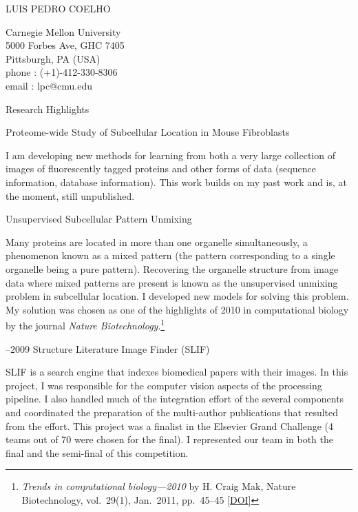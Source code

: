 \documentclass{article}
\renewcommand\section[1]{%
    \par\vspace{2em}\penalty-100%
    {\subhead #1}%
    \par\penalty100\vspace{1em}\penalty100%
}
\newcommand\cvitem[2][\relax]{%
    \par\vspace{.8em}
    \if\relax#1\else{\Date \textcolor{medg}{#1}}\hspace{1em}\fi%
    {\CvItem #2}%
    \par\vspace{.4em}
}
\newcommand\showdoi[1]{%
    \href{http://dx.doi.org/#1}{[DOI]}%
}
\begin{document}
\parindent=0cm

\begin{minipage}[t]{0.60\linewidth}%
\head \textcolor{darkg}{LUIS PEDRO COELHO}

\end{minipage}
\hfill
\begin{minipage}[t]{0.26\textwidth}%
\vspace{-2.2em}
{\Contact%
\textcolor{medg}{
Carnegie Mellon University\\
5000 Forbes Ave, GHC 7405\\
Pittsburgh, PA (USA)}\\
\textcolor{darkg}{phone} : (+1)-412-330-8306\\
\textcolor{darkg}{email} : lpc@cmu.edu
}
\end{minipage}

\vspace{2.3em}

\section{Research Highlights}
\Text

\cvitem[2011]{Proteome-wide Study of Subcellular Location in Mouse Fibroblasts}
I am developing new methods for learning from both a very large collection of
images of fluorescently tagged proteins and other forms of data (sequence
information, database information). This work builds on my past work and is, at
the moment, still unpublished.

\cvitem[2010]{Unsupervised Subcellular Pattern Unmixing}
Many proteins are located in more than one organelle simultaneously, a
phenomenon known as a mixed pattern (the pattern corresponding to a single
organelle being a pure pattern). Recovering the organelle structure from image
data where mixed patterns are present is known as the unsupervised unmixing
problem in subcellular location. I developed new models for
solving this problem. My solution was chosen as one of the highlights of 2010
in computational biology by the journal \emph{Nature Biotechnology}.\footnote{
\emph{Trends in computational biology—2010} by H. Craig Mak, Nature
Biotechnology, vol.\ 29(1), Jan.\ 2011, pp.\ 45--45 \showdoi{10.1038/nbt.1747}}

\cvitem[2008--2009]{Structure Literature Image Finder (SLIF)}
SLIF is a search engine that indexes biomedical papers with their images. In
this project, I was responsible for the computer vision aspects of the
processing pipeline. I also handled much of the integration effort of the
several components and coordinated the preparation of the multi-author
publications that resulted from the effort. This project was a finalist in the
Elsevier Grand Challenge (4 teams out of 70 were chosen for the final). I
represented our team in both the final and the semi-final of this competition.
\end{document}
